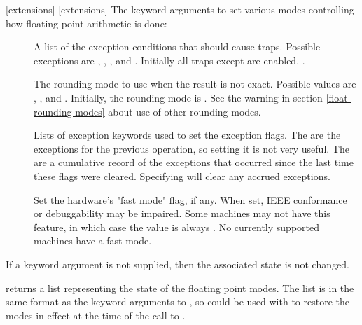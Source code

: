 [extensions]{
       }
[extensions]{}
The keyword arguments to  set various modes
controlling how floating point arithmetic is done:
\begin{description}

\item[]
A list of the exception conditions that should cause traps.
Possible exceptions are , , ,
 and .  Initially all traps except
 are enabled.  .

\item[]
The rounding mode to use when the result is not exact.
Possible values are , ,
 and .  Initially, the rounding mode is
.  See the warning in section \ref{float-rounding-modes} about use
of other rounding modes.


\item[]
Lists of exception keywords used to set the
exception flags.  The  are the exceptions for the
previous operation, so setting it is not very useful.  The
 are a cumulative record of the exceptions that occurred
since the last time these flags were cleared.  Specifying \code{()} will clear any
accrued exceptions.

\item[]
Set the hardware's "fast mode" flag, if any.  When set, IEEE
conformance or debuggability may be impaired.  Some machines may not have this
feature, in which case the value is always \false.  No currently supported
machines have a fast mode.
\end{description}
If a keyword argument is not supplied, then the associated state is not
changed.

 returns a list representing the state of the
floating point modes.  The list is in the same format as the keyword arguments
to , so  could be used with
 to restore the modes in effect at the time of the
call to .
\enddefun


